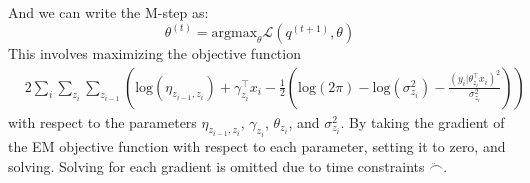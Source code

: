 \documentclass[12pt]{article}
\begin{document}
And we can write the M-step as:
\begin{equation}
    \theta^{(t)} = \text{argmax}_{\theta} \mathcal{L}(q^{(t+1)},\theta)
\end{equation}
This involves maximizing the objective function 
\begin{equation}
    \begin{split}
        & 2\sum_i \sum_{z_i} \sum_{z_{i-1}} \left( \text{log}(\eta_{z_{i-1},z_i}) + \gamma_{z_i}^{\top} x_i 
             -\frac{1}{2}\left( \text{log}(2\pi) - \text{log}(\sigma_{z_i}^2) - \frac{(y_i | \theta_{z_i}^{\top} x_i)^2}{ \sigma_{z_i}^2} \right)  \right)
    \end{split}
\end{equation}
with respect to the parameters $\eta_{z_{i-1},z_i}$, $\gamma_{z_i}$, $\theta_{z_i}$, and $\sigma_{z_i}^2$.
By taking the gradient of the EM objective function with respect to each parameter, setting it to zero, and solving.
Solving for each gradient is omitted due to time constraints $\ddot\frown$.
\end{document}
